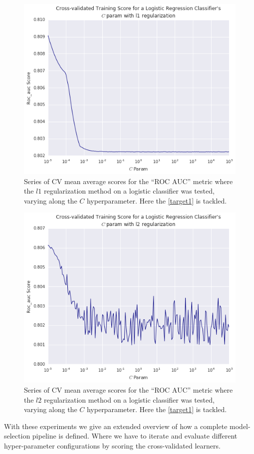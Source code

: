 \begin{figure}[h!]
	\begin{center}
		\includegraphics[width=1\linewidth]{figures/cross_validation/logreg_cv_regularization_l1_rocauc_series}
		\caption{Series of CV mean average scores for the ``ROC AUC'' metric where the $l1$ regularization method on a logistic classifier was tested, varying along the $C$ hyperparameter.
			Here the \cref{target1} is tackled.}
		\label{fig:rocauc_logreg_cv_l1_regularized_comparison}
	\end{center}
\end{figure}



\begin{figure}[h!]
	\begin{center}
		 \includegraphics[width=1\linewidth]{figures/cross_validation/logreg_cv_regularization_l2_rocauc_series}
		\caption{Series of CV mean average scores for the ``ROC AUC'' metric where the $l2$ regularization method on a logistic classifier was tested, varying along the $C$ hyperparameter.
			Here the \cref{target1} is tackled.}
		\label{fig:rocauc_logreg_cv_l2_regularized_comparison}
	\end{center}
\end{figure}


With these experiments we give an extended overview of how a complete model-selection pipeline is defined.
Where we have to iterate and evaluate different hyper-parameter configurations by scoring the cross-validated learners.
